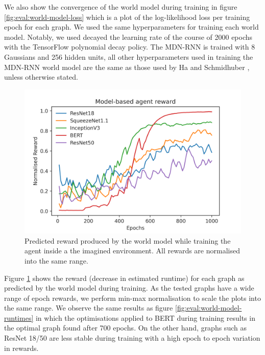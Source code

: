 We also show the convergence of the world model during training in figure \ref{fig:eval:world-model-loss} which is a plot of the log-likelihood loss per training epoch for each graph. We used the same hyperparameters for training each world model. Notably, we used decayed the learning rate of the course of 2000 epochs with the TensorFlow polynomial decay policy. The MDN-RNN is trained with 8 Gaussians and 256 hidden units, all other hyperparameters used in training the MDN-RNN world model are the same as those used by Ha and Schmidhuber \cite{ha2018worldmodels}, unless otherwise stated.

\begin{figure}[ht]
  \centering
  \includegraphics[width=1\columnwidth]{sections/5evaluation/images/mb_ctrl_training_reward.png}
  \caption[Predicted epoch reward during training of agent in world model]{Predicted reward produced by the world model while training the agent inside a the imagined environment. All rewards are normalised into the same range.}
  \label{fig:eval:world-model-pred-reward}
\end{figure}

Figure \ref{fig:eval:world-model-pred-reward} shows the reward (decrease in estimated runtime) for each graph as predicted by the world model during training. As the tested graphs have a wide range of epoch rewards, we perform min-max normalisation to scale the plots into the same range. We observe the same results as figure \ref{fig:eval:world-model-runtimes} in which the optimisations applied to BERT during training results in the optimal graph found after 700 epochs. On the other hand, graphs such as ResNet 18/50 are less stable during training with a high epoch to epoch variation in rewards.

